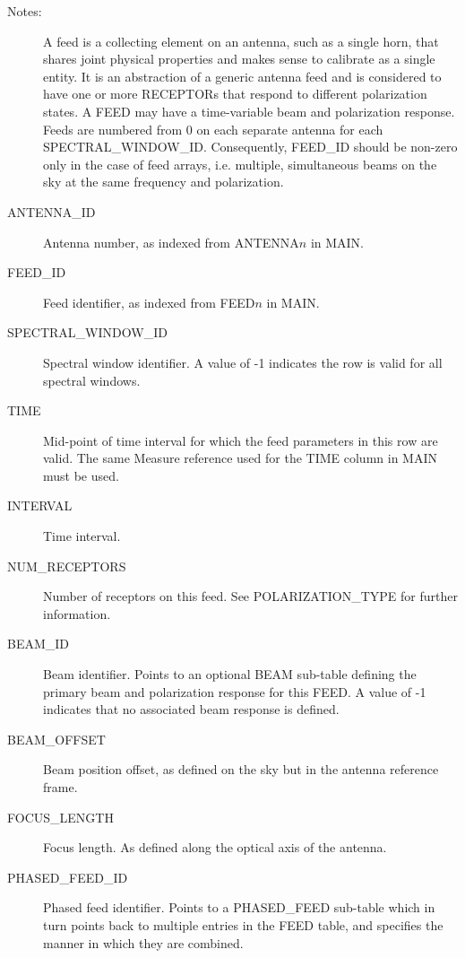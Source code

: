 \documentclass{article}
\begin{document}
\begin{description}

\item[Notes:] A feed is a collecting element on an antenna, such as a
single horn, that shares joint physical properties and makes sense to
calibrate as a single entity. It is an abstraction of a generic
antenna feed and is considered to have one or more RECEPTORs that
respond to different polarization states. A FEED may have a
time-variable beam and polarization response. 
Feeds are numbered from 0 on each separate antenna for each
SPECTRAL\_WINDOW\_ID. Consequently, FEED\_ID should be non-zero only
in the case of feed arrays, i.e. multiple, simultaneous beams on the
sky at the same frequency and polarization.

\item[ANTENNA\_ID] Antenna number, as indexed from ANTENNA$n$ in
MAIN.

\item[FEED\_ID] Feed identifier, as indexed from FEED$n$ in MAIN.

\item[SPECTRAL\_WINDOW\_ID] Spectral window identifier. A value of -1
indicates the row is valid for all spectral windows.

\item[TIME] Mid-point of time interval for which the feed parameters
in this row are valid. The same Measure reference used for the TIME
column in MAIN must be used.

\item[INTERVAL] Time interval. 

\item[NUM\_RECEPTORS] Number of receptors on this feed. See
POLARIZATION\_TYPE for further information.

\item[BEAM\_ID] Beam identifier. Points to an optional BEAM sub-table
defining the primary beam and polarization response for this FEED. A
value of -1 indicates that no associated beam response is defined.

\item[BEAM\_OFFSET] Beam position offset, as defined on the sky but in
the antenna reference frame.

\item[FOCUS\_LENGTH] Focus length. As defined along the optical axis
of the antenna.

\item[PHASED\_FEED\_ID] Phased feed identifier. Points to a
PHASED\_FEED sub-table which in turn points back to multiple entries
in the FEED table, and specifies the manner in which they are
combined. 


\end{description}
\end{document}
